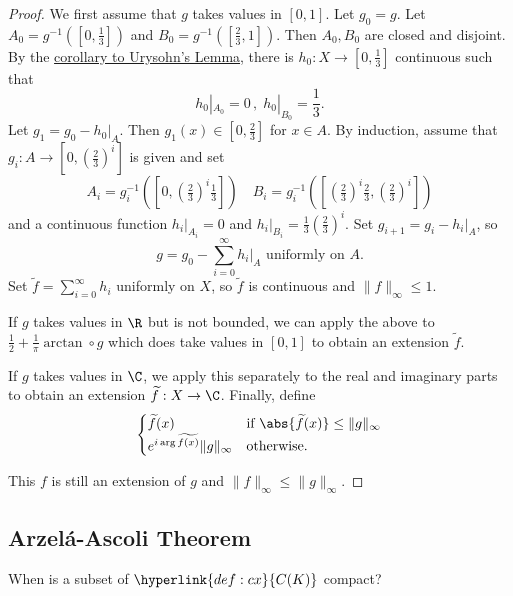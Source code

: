 \documentclass{article}
\begin{document}
\begin{proof}
    We first assume that $g$ takes values in $[0, 1]$. Let $g_0 = g$.
    Let $A_0 = g^{-1}([0, \frac{1}{3}])$ and $B_0 = g^{-1}([\frac{2}{3}, 1])$. Then $A_0, B_0$ are closed and disjoint.
    By the \hyperlink{cor:urysohnCor}{corollary to Urysohn's Lemma}, there is $h_0: X \to [0, \frac{1}{3}]$ continuous such that
    \begin{equation*}
        h_0|_{A_0} = 0 \, , \; h_0|_{B_0} = \frac{1}{3}.
    \end{equation*}
    Let $g_1 = g_0 - h_0|_A$. Then $g_1(x) \in [0, \frac{2}{3}]$ for $x \in A$.
    By induction, assume that $g_i: A \to [0, (\frac{2}{3})^i]$ is given and set
    \begin{equation*}
        A_i = g_i^{-1} \left(\left[0, \left(\tfrac{2}{3}\right)^i \tfrac{1}{3}\right]\right) \quad B_i = g_i^{-1} \left(\left[\left(\tfrac{2}{3}\right)^i \tfrac{2}{3}, \left(\tfrac{2}{3}\right)^i \right]\right)
    \end{equation*}
    and a continuous function $h_i|_{A_i} = 0$ and $h_i|_{B_i} = \frac{1}{3} (\frac{2}{3})^i$. Set $g_{i+1} = g_i - h_i|_A$, so
    \begin{equation*}
        g = g_0 - \sum_{i=0}^\infty h_i|_A \text{ uniformly on } A.
    \end{equation*}
    Set $\widetilde{f} = \sum_{i=0}^\infty h_i$ uniformly on $X$, so $\widetilde{f}$ is continuous and $\|f\|_\infty \leq 1$.

    If $g$ takes values in $\R$ but is not bounded, we can apply the above to $\frac{1}{2} + \frac{1}{\pi} \arctan \circ g$ which does take values in $[0, 1]$ to obtain an extension $\widetilde{f}$.

    If $g$ takes values in $\C$, we apply this separately to the real and imaginary parts to obtain an extension $\widetilde{f}:X \to \C$.
    Finally, define
    \begin{equation*}
        \begin{cases}
            \widetilde{f}(x) & \text{if } \abs{\widetilde{f}(x)} \leq \|g\|_\infty \\
            e^{i \arg \widetilde{f(x)}} \|g\|_\infty & \text{otherwise.}
        \end{cases}
    \end{equation*}

    This $f$ is still an extension of $g$ and $\|f\|_\infty \leq \|g\|_\infty$.
\end{proof}

\subsection{Arzel\'a-Ascoli Theorem}
When is a subset of $\hyperlink{def:cx}{C(K)}$ compact?
\end{document}
